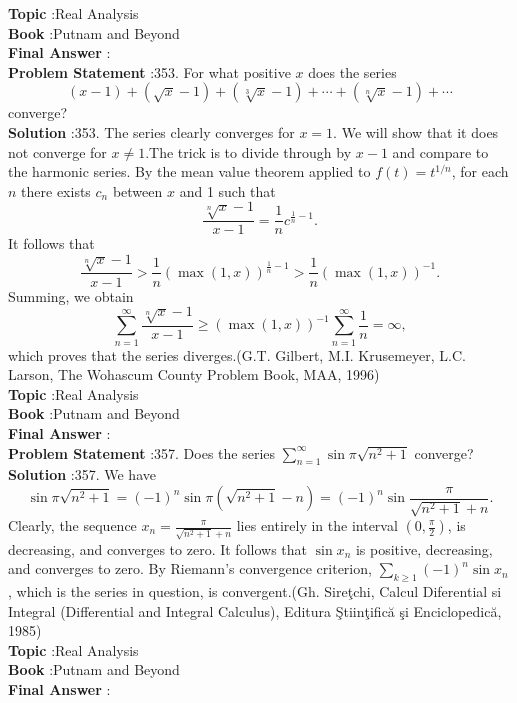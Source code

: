 \documentclass[10pt]{article}
\begin{document}
\textbf{Topic} :Real Analysis\\
\textbf{Book} :Putnam and Beyond\\
\textbf{Final Answer} :\\


\textbf{Problem Statement} :353. For what positive $x$ does the series$$ (x-1)+(\sqrt{x}-1)+(\sqrt[3]{x}-1)+\cdots+(\sqrt[n]{x}-1)+\cdots $$converge?\\
\textbf{Solution} :353. The series clearly converges for $x=1$. We will show that it does not converge for $x \neq 1$.The trick is to divide through by $x-1$ and compare to the harmonic series. By the mean value theorem applied to $f(t)=t^{1 / n}$, for each $n$ there exists $c_{n}$ between $x$ and 1 such that$$ \frac{\sqrt[n]{x}-1}{x-1}=\frac{1}{n} c^{\frac{1}{n}-1} . $$It follows that$$ \frac{\sqrt[n]{x}-1}{x-1}>\frac{1}{n}(\max (1, x))^{\frac{1}{n}-1}>\frac{1}{n}(\max (1, x))^{-1} . $$Summing, we obtain$$ \sum_{n=1}^{\infty} \frac{\sqrt[n]{x}-1}{x-1} \geq(\max (1, x))^{-1} \sum_{n=1}^{\infty} \frac{1}{n}=\infty, $$which proves that the series diverges.(G.T. Gilbert, M.I. Krusemeyer, L.C. Larson, The Wohascum County Problem Book, MAA, 1996)\\
\textbf{Topic} :Real Analysis\\
\textbf{Book} :Putnam and Beyond\\
\textbf{Final Answer} :\\


\textbf{Problem Statement} :357. Does the series $\sum_{n=1}^{\infty} \sin \pi \sqrt{n^{2}+1}$ converge?\\
\textbf{Solution} :357. We have$$ \sin \pi \sqrt{n^{2}+1}=(-1)^{n} \sin \pi\left(\sqrt{n^{2}+1}-n\right)=(-1)^{n} \sin \frac{\pi}{\sqrt{n^{2}+1}+n} . $$Clearly, the sequence $x_{n}=\frac{\pi}{\sqrt{n^{2}+1}+n}$ lies entirely in the interval $\left(0, \frac{\pi}{2}\right)$, is decreasing, and converges to zero. It follows that $\sin x_{n}$ is positive, decreasing, and converges to zero. By Riemann's convergence criterion, $\sum_{k \geq 1}(-1)^{n} \sin x_{n}$, which is the series in question, is convergent.(Gh. Sireţchi, Calcul Diferential si Integral (Differential and Integral Calculus), Editura Ştiinţifică şi Enciclopedică, 1985)\\
\textbf{Topic} :Real Analysis\\
\textbf{Book} :Putnam and Beyond\\
\textbf{Final Answer} :\\
\end{document}
